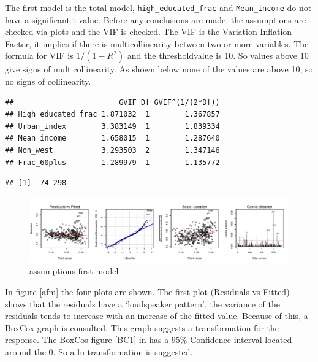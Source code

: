 \documentclass[11pt,]{article}
\begin{document}
The first model is the total model, \texttt{high\_educated\_frac} and
\texttt{Mean\_income} do not have a significant t-value. Before any
conclusions are made, the assumptions are checked via plots and the VIF
is checked. The VIF is the Variation Inflation Factor, it implies if
there is multicollinearity between two or more variables. The formula
for VIF is \(1/(1-R^2)\) and the thresholdvalue is 10. So values above
10 give signs of multicollinearity. As shown below none of the values
are above 10, so no signs of collinearity.

\begin{verbatim}
##                        GVIF Df GVIF^(1/(2*Df))
## High_educated_frac 1.871032  1        1.367857
## Urban_index        3.383149  1        1.839334
## Mean_income        1.658015  1        1.287640
## Non_west           3.293503  2        1.347146
## Frac_60plus        1.289979  1        1.135772
\end{verbatim}

\begin{verbatim}
## [1]  74 298
\end{verbatim}

\begin{figure}[H]

{\centering \includegraphics{lm_part_report_files/figure-latex/unnamed-chunk-1-1} 

}

\caption{\label{afm}assumptions first model}\label{fig:unnamed-chunk-1}
\end{figure}

In figure \ref{afm} the four plots are shown. The first plot (Residuals
vs Fitted) shows that the residuals have a `loudspeaker pattern', the
variance of the residuals tends to increase with an increase of the
fitted value. Because of this, a BoxCox graph is consulted. This graph
suggests a transformation for the response. The BoxCos figure \ref{BC1}
in has a 95\% Confidence interval located around the 0. So a ln
transformation is suggested.
\end{document}
